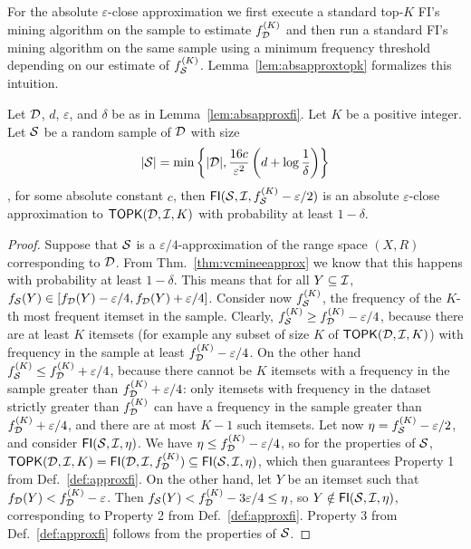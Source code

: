 For the absolute $\varepsilon$-close approximation we first execute a standard
top-$K$ FI's mining algorithm on the sample to estimate $f^{(K)}_{\cal D}$ and then
run a standard FI's mining algorithm on the same sample using a minimum frequency
threshold depending on our estimate of $f_{\cal S}^{(K)}$.
Lemma~\ref{lem:absapproxtopk} formalizes this intuition.

\begin{lemma}\label{lem:absapproxtopk}
  Let ${\cal D}$, $d$, $\varepsilon$, and $\delta$ be as in Lemma~\ref{lem:absapproxfi}.
  Let $K$ be a positive integer. Let ${\cal S}$ be a random sample of ${\cal D}$ with
  size
  \[
  |{\cal S}|=\min\left\{|{\cal D}|,\frac{16c}{\varepsilon^2}\left(d+\log\frac{1}{\delta}\right)\right\}\],
  for some absolute constant $c$, then $\mathsf{FI}({\cal S},{\cal I},f_{\cal S}^{(K)}-\varepsilon/2)$ is an absolute
  $\varepsilon$-close approximation to $\mathsf{TOPK}({\cal D},{\cal I},K)$ with probability at
  least $1-\delta$.
\end{lemma}

\begin{proof}
  Suppose that ${\cal S}$ is a $\varepsilon/4$-approximation of the range
  space $(X,R)$ corresponding to ${\cal D}$. From Thm.~\ref{thm:vcmineeapprox} we know that
  this happens with probability at least $1-\delta$. This means that for all
  $Y\subseteq{\cal I}$,
  $f_{\cal S}(Y)\in[f_{\cal D}(Y)-\varepsilon/4,f_{\cal D}(Y)+\varepsilon/4]$.
  Consider now $f_{\cal S}^{(K)}$, the frequency of the $K$-th most frequent itemset
  in the sample. Clearly, $f_{\cal S}^{(K)}\ge f_{\cal D}^{(K)}-\varepsilon/4$,
  because there are at least $K$ itemsets (for example any subset of size $K$ of
  $\mathsf{TOPK}({\cal D},{\cal I},K)$) with frequency in the sample at least
  $f_{\cal D}^{(K)}-\varepsilon/4$. On the other hand $f_{\cal S}^{(K)}\le
  f_{\cal D}^{(K)}+\varepsilon/4$, because there cannot be $K$ itemsets with a
  frequency in the sample greater than $f_{\cal D}^{(K)}+\varepsilon/4$: only
  itemsets with frequency in the dataset strictly greater than $f_{\cal D}^{(K)}$ can
  have a frequency in the sample greater than
  $f_{\cal D}^{(K)}+\varepsilon/4$, and there are at most $K-1$ such
  itemsets. Let now $\eta=f_{\cal S}^{(K)}-\varepsilon/2$, and consider
  $\mathsf{FI}({\cal S},{\cal I},\eta)$. We have $\eta\le f_{\cal D}^{(K)}-\varepsilon/4$, so
  for the properties of ${\cal S}$,
  $\mathsf{TOPK}({\cal D},{\cal I},K)=\mathsf{FI}({\cal D},{\cal I},f_{\cal D}^{(K)})\subseteq\mathsf{FI}({\cal S},{\cal I},\eta)$,
  which then guarantees Property 1 from Def.~\ref{def:approxfi}. On
  the other hand, let $Y$ be an itemset such that
  $f_{\cal D}(Y)<f_{\cal D}^{(K)}-\varepsilon$. Then $f_{\cal S}(Y)<
  f_{\cal D}^{(K)}-3\varepsilon/4\le\eta$, so $Y\notin\mathsf{FI}({\cal S},{\cal I},\eta)$,
  corresponding to Property 2 from Def.~\ref{def:approxfi}. Property 3 from
  Def.~\ref{def:approxfi} follows from the properties of ${\cal S}$.
\end{proof}

